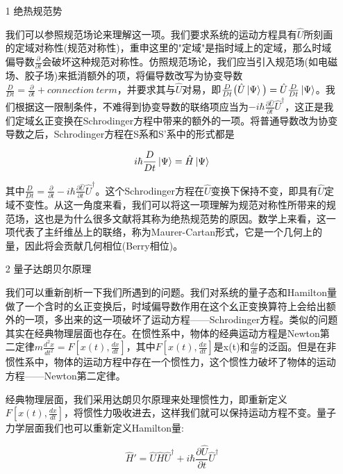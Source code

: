 \documentclass[a4paper]{article}
\begin{document}
        \begin{itemize}
        \item[1] 绝热规范势 
            
            我们可以参照规范场论来理解这一项。我们要求系统的运动方程具有$\hat{U}$所刻画的定域对称性(规范对称性)，重申这里的"定域"是指时域上的定域，那么时域偏导数$\frac{\partial}{\partial t}$会破坏这种规范对称性。仿照规范场论，我们应当引入规范场(如电磁场、胶子场)来抵消额外的项，将偏导数改写为协变导数$\frac{D}{Dt}=\frac{\partial}{\partial t}+connection\ term$，并要求其与$\hat{U}$对易，即$\frac{D}{Dt}\big(\hat{U}\ket{\Psi}\big)=\hat{U}\frac{D}{Dt}\ket{\Psi}$。我们根据这一限制条件，不难得到协变导数的联络项应当为$-i\hbar\frac{\partial\hat{U}}{\partial t}\hat{U}^\dagger$，这正是我们定域幺正变换在Schrodinger方程中带来的额外的一项。将普通导数改为协变导数之后，Schrodinger方程在S系和S'系中的形式都是

            \begin{equation}
                i\hbar\frac{D}{Dt}\ket{\Psi} = \hat{H}\ket{\Psi}
            \end{equation}

            其中$\frac{D}{Dt}=\frac{\partial}{\partial t}-i\hbar\frac{\partial\hat{U}}{\partial t}\hat{U}^\dagger$。这个Schrodinger方程在$\hat{U}$变换下保持不变，即具有$\hat{U}$定域不变性。从这一角度来看，我们可以将这一项理解为规范对称性所带来的规范场，这也是为什么很多文献将其称为绝热规范势的原因。数学上来看，这一项代表了主纤维丛上的联络，称为Maurer-Cartan形式，它是一个几何上的量，因此将会贡献几何相位(Berry相位)。
        
        \item[2] 量子达朗贝尔原理
            
            我们可以重新剖析一下我们所遇到的问题。我们对系统的量子态和Hamilton量做了一个含时的幺正变换后，时域偏导数作用在这个幺正变换算符上会给出额外的一项，多出来的这一项破坏了运动方程——Schrodinger方程。类似的问题其实在经典物理层面也存在。在惯性系中，物体的经典运动方程是Newton第二定律$m\frac{d^2x}{dt^2}=F[x(t),\frac{dx}{dt}]$，其中$F[x(t),\frac{dx}{dt}]$是x(t)和$\frac{dx}{dt}$的泛函。但是在非惯性系中，物体的运动方程中存在一个惯性力，这个惯性力破坏了物体的运动方程——Newton第二定律。

            经典物理层面，我们采用达朗贝尔原理来处理惯性力，即重新定义$F[x(t),\frac{dx}{dt}]$，将惯性力吸收进去，这样我们就可以保持运动方程不变。量子力学层面我们也可以重新定义Hamilton量:
            
            \begin{equation}
                \hat{H}'=\hat{U}\hat{H}\hat{U}^\dagger + i\hbar\frac{\partial\hat{U}}{\partial t}\hat{U}^\dagger
            \end{equation}


\end{itemize}
\end{document}
